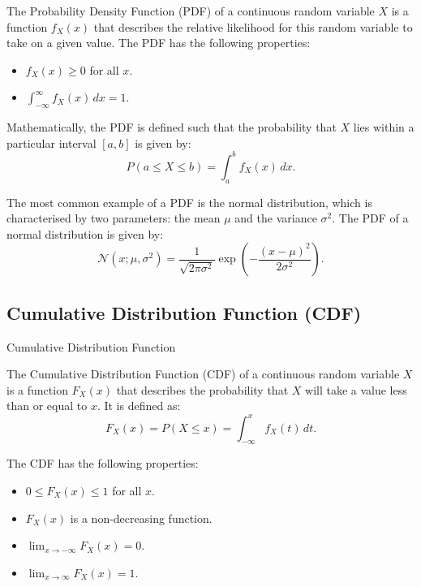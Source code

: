 The Probability Density Function (PDF) of a continuous random variable \(X\) is a function \(f_X(x)\) that describes the relative likelihood for this random variable to take on a given value. The PDF has the following properties:
\begin{itemize}
    \item \(f_X(x) \geq 0\) for all \(x\).
    \item \(\int_{-\infty}^{\infty} f_X(x) \, dx = 1\).
\end{itemize}

Mathematically, the PDF is defined such that the probability that \(X\) lies within a particular interval \([a, b]\) is given by:
\[
    P(a \leq X \leq b) = \int_{a}^{b} f_X(x) \, dx.
\]

The most common example of a PDF is the normal distribution, which is characterised by two parameters: the mean \(\mu\) and the variance \(\sigma^2\). The PDF of a normal distribution is given by:
\[
\mathcal{N}(x; \mu, \sigma^2) = \frac{1}{\sqrt{2\pi\sigma^2}} \exp\left(-\frac{(x - \mu)^2}{2\sigma^2}\right).  
\]


\subsection{Cumulative Distribution Function (CDF)}
\begin{marginfigure}[50pt]
    \centering
    \caption{Cumulative Distribution Function}
\end{marginfigure}

The Cumulative Distribution Function (CDF) of a continuous random variable \(X\) is a function \(F_X(x)\) that describes the probability that \(X\) will take a value less than or equal to \(x\). It is defined as:
\[
    F_X(x) = P(X \leq x) = \int_{-\infty}^{x} f_X(t) \, dt.
\]

The CDF has the following properties:
\begin{itemize}
    \item \(0 \leq F_X(x) \leq 1\) for all \(x\).
    \item \(F_X(x)\) is a non-decreasing function.
    \item \(\lim_{x \to -\infty} F_X(x) = 0\).
    \item \(\lim_{x \to \infty} F_X(x) = 1\).
\end{itemize}

